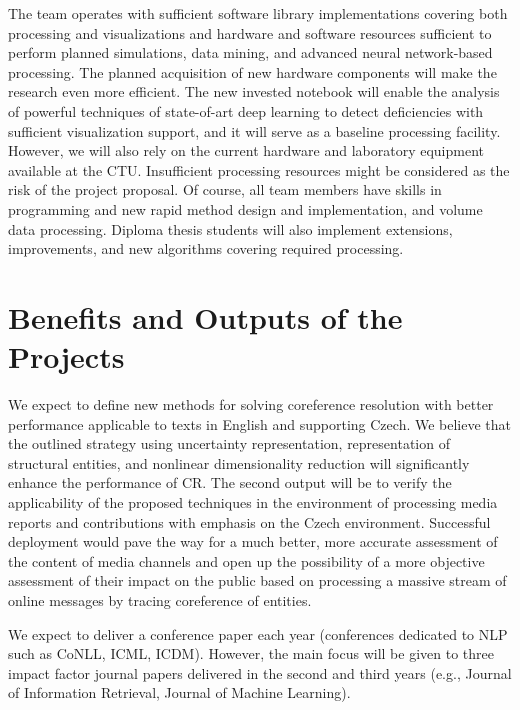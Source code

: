 The team operates with sufficient software library implementations covering both processing and visualizations and hardware and software resources sufficient to perform planned simulations, data mining, and advanced neural network-based processing. The planned acquisition of new hardware components will make the research even more efficient. The new invested notebook will enable the analysis of powerful techniques of state-of-art deep learning to detect deficiencies with sufficient visualization support, and it will serve as a baseline processing facility. However, we will also rely on the current hardware and laboratory equipment available at the CTU. Insufficient processing resources might be considered as the risk of the project proposal. Of course, all team members have skills in programming and new rapid method design and implementation, and volume data processing. Diploma thesis students will also implement extensions, improvements, and new algorithms covering required processing.

\section{Benefits and Outputs of the Projects}

We expect to define new methods for solving coreference resolution with better performance applicable to texts in English and supporting Czech. We believe that the outlined strategy using uncertainty representation, representation of structural entities, and nonlinear dimensionality reduction will significantly enhance the performance of CR.
The second output will be to verify the applicability of the proposed techniques in the environment of processing media reports and contributions with emphasis on the Czech environment. Successful deployment would pave the way for a much better, more accurate assessment of the content of media channels and open up the possibility of a more objective assessment of their impact on the public based on processing a massive stream of online messages by tracing coreference of entities.

We expect to deliver a conference paper each year (conferences dedicated to NLP such as CoNLL, ICML, ICDM). However, the main focus will be given to three impact factor journal papers delivered in the second and third years (e.g., Journal of Information Retrieval, Journal of Machine Learning).

